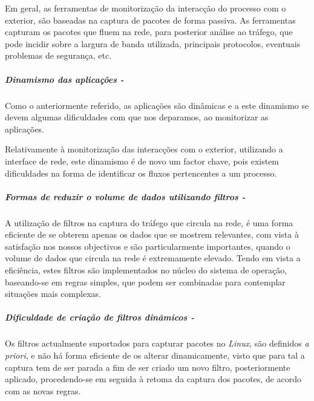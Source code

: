 % 
% 

Em geral, as ferramentas de monitorização da interacção do processo com o exterior, são baseadas na captura de pacotes de forma passiva.
As ferramentas capturam os pacotes que fluem na rede, para posterior análise ao tráfego, que pode incidir sobre a largura de banda utilizada, principais protocolos, eventuais problemas de segurança, etc.

\subparagraph*{Dinamismo das aplicações - }
Como o anteriormente referido, as aplicações são dinâmicas e a este dinamismo se devem algumas dificuldades com que nos deparamos, ao monitorizar as aplicações.

Relativamente à monitorização das interacções com o exterior, utilizando a interface de rede, este dinamismo é de novo um factor chave, pois existem dificuldades na forma de identificar os fluxos pertencentes a um processo.

\subparagraph*{Formas de reduzir o volume de dados utilizando filtros - }
A utilização de filtros na captura do tráfego que circula na rede, é uma forma eficiente de se obterem apenas os dados que se mostrem relevantes, com vista à satisfação nos nossos objectivos e são particularmente importantes, quando o volume de dados que circula na rede é extremamente elevado.
Tendo em vista a eficiência, estes filtros são implementados no núcleo do sistema de operação, baseando-se em regras simples, que podem ser combinadas para contemplar situações mais complexas.

\subparagraph*{Dificuldade de criação de filtros dinâmicos - }
Os filtros actualmente suportados para capturar pacotes no \textit{Linux}, são definidos \textit{a priori}, e não há forma eficiente de os alterar dinamicamente, visto que para tal a captura tem de ser parada a fim de ser criado um novo filtro, posteriormente aplicado, procedendo-se em seguida à retoma da captura dos pacotes, de acordo com as novas regras.

